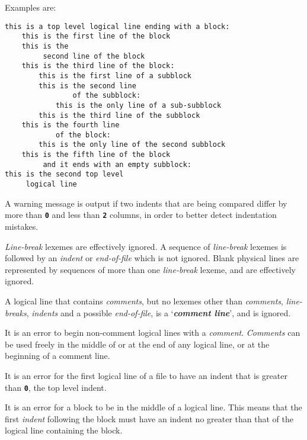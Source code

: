 \documentclass[12pt]{article}
\newcommand{\TT}[1]{{\tt \bfseries #1}}
\newcommand{\key}[1]{{\bf \em #1}\index{#1}}
\newenvironment{indpar}[1][0.3in]%
	{\begin{list}{}%
		     {\setlength{\itemsep}{0in}%
		      \setlength{\topsep}{0in}%
		      \setlength{\parsep}{1ex}%
		      \setlength{\labelwidth}{#1}%
		      \setlength{\leftmargin}{#1}%
		      \addtolength{\leftmargin}{\labelsep}}%
	 \item}%
	{\end{list}}
\begin{document}
Examples are:
\begin{indpar}\begin{verbatim}
this is a top level logical line ending with a block:
    this is the first line of the block
    this is the
         second line of the block
    this is the third line of the block:
        this is the first line of a subblock
        this is the second line
                of the subblock:
            this is the only line of a sub-subblock
        this is the third line of the subblock
    this is the fourth line
            of the block:
        this is the only line of the second subblock
    this is the fifth line of the block
         and it ends with an empty subblock:
this is the second top level
     logical line
\end{verbatim}\end{indpar}

A warning message is output if two indents that are being compared
differ by more than \TT{0} and
less than \TT{2} columns, in order to better detect
indentation mistakes.

{\em Line-break} lexemes are effectively ignored.  A sequence
of {\em line-break} lexemes is followed by an {\em indent}
or {\em end-of-file} which is not ignored.
Blank physical lines are represented by sequences of
more than one {\em line-break} lexeme, and are effectively
ignored.

A logical line that contains {\em comments}, but no
lexemes other than {\em comments}, {\em line-breaks}, {\em indents}
and a possible {\em end-of-file}, is
a `\key{comment line}', and is ignored.

It is an error to begin non-comment logical lines with
a {\em comment}.
{\em Comments} can be used freely in the middle of or at the
end of any logical line, or at the beginning of a comment line.

It is an error for the first logical line of a file
to have an indent that is greater than \TT{0}, the top level
indent.

It is an error for a block to be in the middle of a logical
line.  This means that the first {\em indent} following the
block must have an indent no greater than that of the logical
line containing the block.
\end{document}
